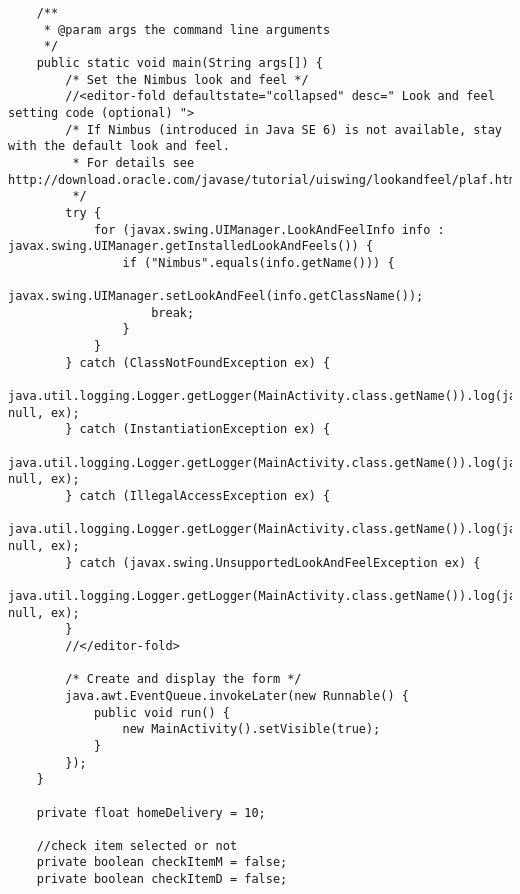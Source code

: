 \documentclass[12pt,a4paper]{article}
\begin{document}
\begin{lstlisting}
    /**
     * @param args the command line arguments
     */
    public static void main(String args[]) {
        /* Set the Nimbus look and feel */
        //<editor-fold defaultstate="collapsed" desc=" Look and feel setting code (optional) ">
        /* If Nimbus (introduced in Java SE 6) is not available, stay with the default look and feel.
         * For details see http://download.oracle.com/javase/tutorial/uiswing/lookandfeel/plaf.html 
         */
        try {
            for (javax.swing.UIManager.LookAndFeelInfo info : javax.swing.UIManager.getInstalledLookAndFeels()) {
                if ("Nimbus".equals(info.getName())) {
                    javax.swing.UIManager.setLookAndFeel(info.getClassName());
                    break;
                }
            }
        } catch (ClassNotFoundException ex) {
            java.util.logging.Logger.getLogger(MainActivity.class.getName()).log(java.util.logging.Level.SEVERE, null, ex);
        } catch (InstantiationException ex) {
            java.util.logging.Logger.getLogger(MainActivity.class.getName()).log(java.util.logging.Level.SEVERE, null, ex);
        } catch (IllegalAccessException ex) {
            java.util.logging.Logger.getLogger(MainActivity.class.getName()).log(java.util.logging.Level.SEVERE, null, ex);
        } catch (javax.swing.UnsupportedLookAndFeelException ex) {
            java.util.logging.Logger.getLogger(MainActivity.class.getName()).log(java.util.logging.Level.SEVERE, null, ex);
        }
        //</editor-fold>

        /* Create and display the form */
        java.awt.EventQueue.invokeLater(new Runnable() {
            public void run() {
                new MainActivity().setVisible(true);
            }
        });
    }

    private float homeDelivery = 10;

    //check item selected or not
    private boolean checkItemM = false;
    private boolean checkItemD = false;


\end{lstlisting}
\end{document}
